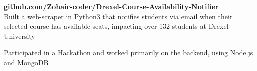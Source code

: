 \documentclass[]{deedy-resume-openfont}
\begin{document}
\begin{minipage}[t]{0.33\textwidth}
        \vspace{\topsep}
        
        \textbf{\href{https://github.com/Zohair-coder/Drexel-Course-Availability-Notifier}{github.com/Zohair-coder/Drexel-Course-Availability-Notifier}} \\
        \vspace{\topsep}
        Built a web-scraper in Python3 that notifies students via email when their selected course has available seats, impacting over 132 students at Drexel University
        
        \vspace{\topsep}
        
        Participated in a Hackathon and worked primarily on the backend, using Node.js and MongoDB
        
        
        

\end{minipage}
\end{document}
